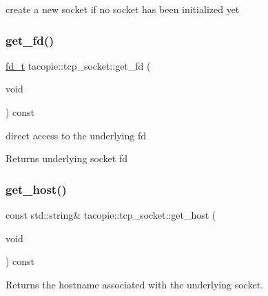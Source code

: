 create a new socket if no socket has been initialized yet \mbox{\label{classtacopie_1_1tcp__socket_a4fd367a1802ed6ae7fa0e33fc07ed255}} 
\subsubsection{\texorpdfstring{get\+\_\+fd()}{get\_fd()}}
{\footnotesize\ttfamily \hyperlink{namespacetacopie_acce7ad26b2d30156b1e6fa353f727026}{fd\+\_\+t} tacopie\+::tcp\+\_\+socket\+::get\+\_\+fd (\begin{DoxyParamCaption}\item[{void}]{ }\end{DoxyParamCaption}) const}

direct access to the underlying fd

\begin{DoxyReturn}{Returns}
underlying socket fd 
\end{DoxyReturn}
\mbox{\label{classtacopie_1_1tcp__socket_ad294565f9a0fa52639ecfbf133eecd59}} 
\subsubsection{\texorpdfstring{get\+\_\+host()}{get\_host()}}
{\footnotesize\ttfamily const std\+::string\& tacopie\+::tcp\+\_\+socket\+::get\+\_\+host (\begin{DoxyParamCaption}\item[{void}]{ }\end{DoxyParamCaption}) const}

\begin{DoxyReturn}{Returns}
the hostname associated with the underlying socket. 
\end{DoxyReturn}
\mbox{\label{classtacopie_1_1tcp__socket_a5276fdc687ac3c5089a05e3e2d9de4fb}} 
